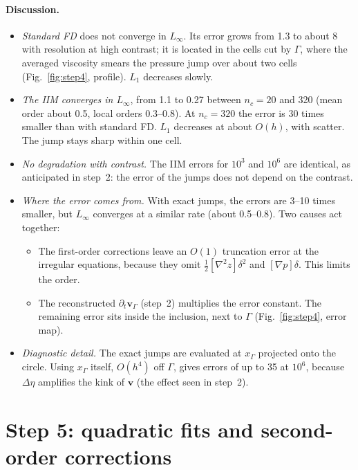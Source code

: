 \documentclass[11pt,a4paper]{article}
\begin{document}
\paragraph{Discussion.}
\begin{itemize}
  \item \emph{Standard FD} does not converge in $L_\infty$. Its error grows from 1.3 to about 8
    with resolution at high contrast; it is located in the cells cut by $\Gamma$, where the
    averaged viscosity smears the pressure jump over about two cells (Fig.~\ref{fig:step4},
    profile). $L_1$ decreases slowly.
  \item \emph{The IIM converges in $L_\infty$}, from 1.1 to 0.27 between $n_c=20$ and 320
    (mean order about 0.5, local orders 0.3--0.8). At $n_c=320$ the error is 30 times smaller
    than with standard FD. $L_1$ decreases at about $O(h)$, with scatter. The jump stays sharp
    within one cell.
  \item \emph{No degradation with contrast.} The IIM errors for $10^3$ and $10^6$ are identical,
    as anticipated in step~2: the error of the jumps does not depend on the contrast.
  \item \emph{Where the error comes from.} With exact jumps, the errors are 3--10 times smaller,
    but $L_\infty$ converges at a similar rate (about 0.5--0.8). Two causes act together:
    \begin{itemize}
      \item The first-order corrections leave an $O(1)$ truncation error at the irregular
        equations, because they omit $\tfrac12[\nabla^2z]\delta^2$ and $[\nabla p]\delta$. This
        limits the order.
      \item The reconstructed $\partial_t\mathbf v_\Gamma$ (step~2) multiplies the error
        constant. The remaining error sits inside the inclusion, next to $\Gamma$
        (Fig.~\ref{fig:step4}, error map).
    \end{itemize}
  \item \emph{Diagnostic detail.} The exact jumps are evaluated at $x_\Gamma$ projected onto the
    circle. Using $x_\Gamma$ itself, $O(h^4)$ off $\Gamma$, gives errors of up to 35 at $10^6$,
    because $\Delta\eta$ amplifies the kink of $\mathbf v$ (the effect seen in step~2).
\end{itemize}

\section{Step 5: quadratic fits and second-order corrections}\label{sec:s5}
\end{document}
